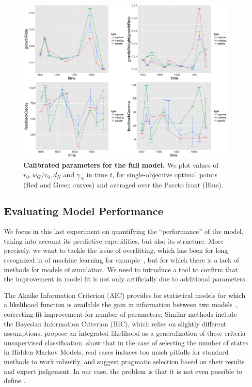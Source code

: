 \documentclass[Royal,sageh,times]{sagej}
\begin{document}
\begin{figure}
\centering
\includegraphics[width=\textwidth]{figures/Fig6}
\caption{\textbf{Calibrated parameters for the full model.} We plot values of $r_0, w_G/r_0, d_N$ and $\gamma_N$ in time $t$, for single-objective optimal points (Red and Green curves) and averaged over the Pareto front (Blue).}
\label{fig:feedback}
\end{figure}







\subsection*{Evaluating Model Performance}

We focus in this last experiment on quantifying the ``performance'' of the model, taking into account  its predictive capabilities, but also its structure. More precisely, we want to tackle the issue of overfitting, which has been for long recognized in  of machine learning for example~\citep{dietterich1995overfitting}, but for which there is a lack of methods for models of simulation. We need to introduce a tool to confirm that the improvement in model fit is not only artificially due to additional parameters.

The Akaike Information Criterion (AIC) provides for statistical models for which a likelihood function is available the gain in information between two models~\citep{akaike1998information}, correcting fit improvement for number of parameters. Similar methods include the Bayesian Information Criterion (BIC), which relies on slightly different assumptions. \cite{biernacki2000assessing} propose an integrated likelihood as a generalization of these criteria  unsupervised classification. \cite{2017arXiv170108673P} show that in the case of selecting the number of states in Hidden Markov Models, real cases induces too much pitfalls for standard methods to work robustly, and suggest pragmatic selection based on their results and expert judgement. In our case, the problem is that it is not even possible to define .
\end{document}
